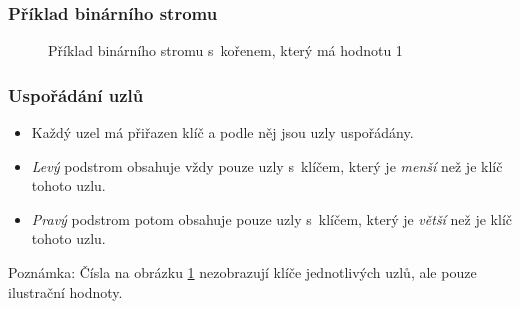\documentclass[10pt]{beamer}
\begin{document}
\begin{frame}\frametitle{Příklad binárního stromu}

    \begin{figure}[ht]
        \centering
        \caption{Příklad binárního stromu s~kořenem, který má hodnotu 1}
        \label{imgBinaryTree}
    \end{figure}
    
\end{frame}

\begin{frame}\frametitle{Uspořádání uzlů}

    \begin{itemize}
        \item Každý uzel má přiřazen klíč a podle něj jsou uzly uspořádány.
        \item \emph{Levý} podstrom obsahuje vždy pouze uzly s~klíčem, který je \emph{menší} než je klíč tohoto uzlu.
        \item \emph{Pravý} podstrom potom obsahuje pouze uzly s~klíčem, který je \emph{větší} než je klíč tohoto uzlu.
    \end{itemize}
    
    \begin{alertblock}{Poznámka:}
        Čísla na obrázku \ref{imgBinaryTree} nezobrazují klíče jednotlivých uzlů, ale pouze ilustrační hodnoty.
    \end{alertblock}

\end{frame}
\end{document}
